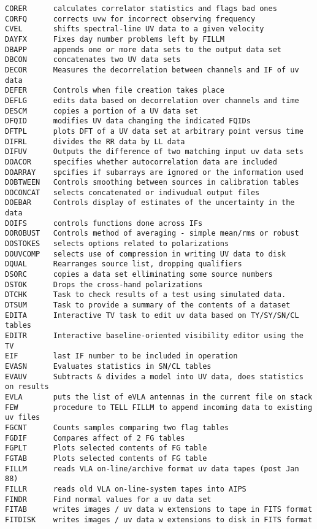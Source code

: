 \begin{verbatim}
CORER      calculates correlator statistics and flags bad ones
CORFQ      corrects uvw for incorrect observing frequency
CVEL       shifts spectral-line UV data to a given velocity
DAYFX      Fixes day number problems left by FILLM
DBAPP      appends one or more data sets to the output data set
DBCON      concatenates two UV data sets
DECOR      Measures the decorrelation between channels and IF of uv data
DEFER      Controls when file creation takes place
DEFLG      edits data based on decorrelation over channels and time
DESCM      copies a portion of a UV data set
DFQID      modifies UV data changing the indicated FQIDs
DFTPL      plots DFT of a UV data set at arbitrary point versus time
DIFRL      divides the RR data by LL data
DIFUV      Outputs the difference of two matching input uv data sets
DOACOR     specifies whether autocorrelation data are included
DOARRAY    spcifies if subarrays are ignored or the information used
DOBTWEEN   Controls smoothing between sources in calibration tables
DOCONCAT   selects concatenated or indivudual output files
DOEBAR     Controls display of estimates of the uncertainty in the data
DOIFS      controls functions done across IFs
DOROBUST   Controls method of averaging - simple mean/rms or robust
DOSTOKES   selects options related to polarizations
DOUVCOMP   selects use of compression in writing UV data to disk
DQUAL      Rearranges source list, dropping qualifiers
DSORC      copies a data set elliminating some source numbers
DSTOK      Drops the cross-hand polarizations
DTCHK      Task to check results of a test using simulated data.
DTSUM      Task to provide a summary of the contents of a dataset
EDITA      Interactive TV task to edit uv data based on TY/SY/SN/CL tables
EDITR      Interactive baseline-oriented visibility editor using the TV
EIF        last IF number to be included in operation
EVASN      Evaluates statistics in SN/CL tables
EVAUV      Subtracts & divides a model into UV data, does statistics on results
EVLA       puts the list of eVLA antennas in the current file on stack
FEW        procedure to TELL FILLM to append incoming data to existing uv files
FGCNT      Counts samples comparing two flag tables
FGDIF      Compares affect of 2 FG tables
FGPLT      Plots selected contents of FG table
FGTAB      Plots selected contents of FG table
FILLM      reads VLA on-line/archive format uv data tapes (post Jan 88)
FILLR      reads old VLA on-line-system tapes into AIPS
FINDR      Find normal values for a uv data set
FITAB      writes images / uv data w extensions to tape in FITS format
FITDISK    writes images / uv data w extensions to disk in FITS format

\end{verbatim}
